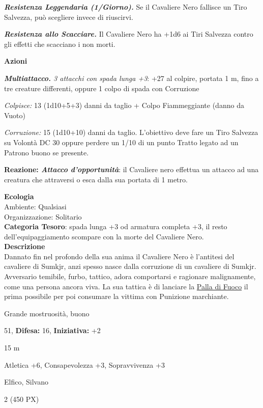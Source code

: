 \begin{multicols}{2}
{\emph{\textbf{Resistenza Leggendaria (1/Giorno).}} Se il Cavaliere Nero fallisce un Tiro Salvezza, può scegliere invece di riuscirvi.

\emph{\textbf{Resistenza allo Scacciare.}} Il Cavaliere Nero ha +1d6 ai Tiri Salvezza contro gli effetti che scacciano i non morti.

\textbf{Azioni}

\emph{\textbf{Multiattacco.} 3 attacchi con spada lunga +3}: +27 al colpire, portata 1 m, fino a tre creature differenti, oppure 1 colpo di spada con Corruzione

\emph{Colpisce:} 13 (1d10+5+3) danni da taglio + Colpo Fiammeggiante (danno da Vuoto)

\emph{Corruzione:} 15 (1d10+10) danni da taglio. L'obiettivo deve fare un Tiro Salvezza su Volontà DC 30 oppure perdere un 1/10 di un punto Tratto legato ad un Patrono buono se presente.

\textbf{Reazione: \emph{Attacco d'opportunità}}: il Cavaliere nero effettua un attacco ad una creatura che attraversi o esca dalla sua portata di 1 metro.

\textbf{Ecologia}\\
Ambiente: Qualsiasi\\
Organizzazione: Solitario\\
\textbf{Categoria Tesoro}: spada lunga +3 od armatura completa +3, il resto dell'equipaggiamento scompare con la morte del Cavaliere Nero.\\
\textbf{Descrizione}\\
Dannato fin nel profondo della sua anima il Cavaliere Nero è l'antitesi del cavaliere di Sumkjr, anzi spesso nasce dalla corruzione di un cavaliere di Sumkjr. Avversario temibile, furbo, tattico, adora comportarsi e ragionare malignamente, come una persona ancora viva. La sua tattica è di lanciare la \hyperlink{Palla di Fuoco}{Palla di Fuoco} il prima possibile per poi consumare la vittima con Punizione marchiante.

\noindent
\begin{description}[noitemsep, topsep=0pt, parsep=0pt, partopsep=0pt, leftmargin=0cm, labelwidth=2.2cm]
	\item[\textbf{Taglia/Tipo:}] Grande mostruosità, buono
	\item[\textbf{Caratt.:}] 
	\item[\textbf{Punti Ferita:}] 51,  \textbf{Difesa:} 16,  \textbf{Iniziativa:} +2
	\item[\textbf{Movimento:}] 15 m
	\item[\textbf{Tiri Salvez.:}] 
	\item[\textbf{Comp.:}] Atletica +6, Consapevolezza +3, Sopravvivenza +3
	\item[\textbf{Linguaggi:}] Elfico, Silvano
	\item[\textbf{Sfida:}] 2 (450 PX)\smallskip
\end{description}

}
\end{multicols}
